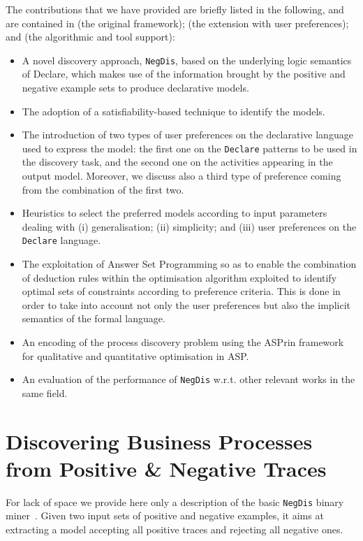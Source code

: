 \documentclass[letterpaper]{article} %
\theoremstyle{definition}
\newcommand{\nd}{\texttt{NegDis}\xspace}
\newcommand{\declare}{\texttt{Declare}\xspace}
\begin{document}
The contributions that we have provided are briefly listed in the following, and are contained in \cite{deviant-tkde} (the original framework); \cite{DBLP:conf/cilc/ChesaniFGLMMMPT22,DBLP:conf/edoc/ChesaniFGGLMMMT22} (the extension with user preferences); and \cite{DBLP:conf/lpnmr/ChesaniFGGLMMMT22} (the algorithmic and tool support):
\begin{itemize}
\item A novel discovery approach, \nd, based on the underlying logic semantics of Declare, which makes use of the information brought by the positive and negative example sets to produce declarative models.
\item The adoption of a satisfiability-based technique to identify the models.
\item The introduction of two types of user preferences on the declarative language used to express the model: the first one on the \declare patterns to be used in the discovery task, and the second one on the activities appearing in the output model. Moreover, we discuss also a third type of preference coming from the combination of the first two.
\item Heuristics to select the preferred models according to input parameters dealing with (i) generalisation; (ii)  simplicity; and (iii) user preferences on the \declare language.
\item The exploitation of Answer Set Programming so as to enable the combination of deduction rules within the optimisation algorithm exploited to identify optimal sets of constraints according to preference criteria. This is done in order to take into account not only the user preferences but also the implicit semantics of the formal language.
\item An encoding of the process discovery problem using the ASPrin framework for qualitative and quantitative optimisation in ASP.
\item An evaluation of the performance of \nd w.r.t. other relevant works in the same field.
\end{itemize}


\section{Discovering Business Processes from Positive \& Negative Traces}
\label{sec:deviant}

For lack of space we provide here only a description of the basic \nd binary miner~\cite{deviant-tkde}. Given two input sets of positive and negative examples, it aims at extracting a model accepting all positive traces and rejecting all negative ones. %
\end{document}
